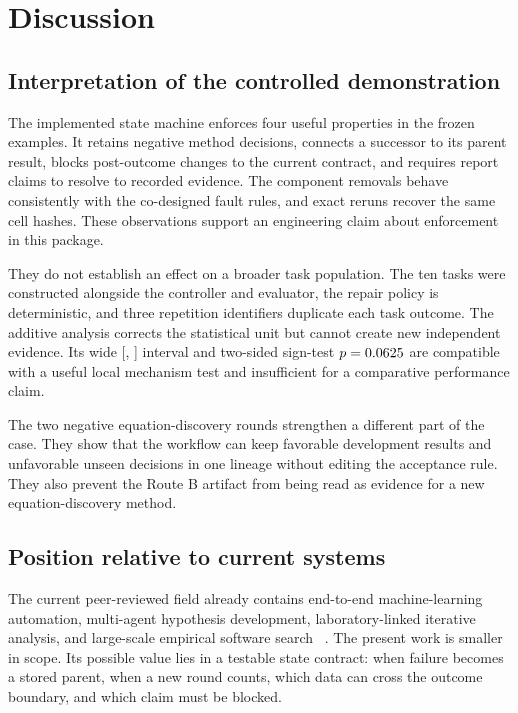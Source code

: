 \section{Discussion}
\label{sec:discussion}

\subsection{Interpretation of the controlled demonstration}

The implemented state machine enforces four useful properties in the frozen
examples. It retains negative method decisions, connects a successor to its
parent result, blocks post-outcome changes to the current contract, and
requires report claims to resolve to recorded evidence. The component
removals behave consistently with the co-designed fault rules, and exact
reruns recover the same cell hashes. These observations support an engineering
claim about enforcement in this package.

They do not establish an effect on a broader task population. The ten tasks
were constructed alongside the controller and evaluator, the repair policy is
deterministic, and three repetition identifiers duplicate each task outcome.
The additive analysis corrects the statistical unit but cannot create new
independent evidence. Its wide [\TaskLevelCILower{}, \TaskLevelCIUpper{}]
interval and two-sided sign-test \(p=0.0625{}\) are compatible with
a useful local mechanism test and insufficient for a comparative performance
claim.

The two negative equation-discovery rounds strengthen a different part of the
case. They show that the workflow can keep favorable development results and
unfavorable unseen decisions in one lineage without editing the acceptance
rule. They also prevent the Route B artifact from being read as evidence for
a new equation-discovery method.

\subsection{Position relative to current systems}

The current peer-reviewed field already contains end-to-end machine-learning
automation, multi-agent hypothesis development, laboratory-linked iterative
analysis, and large-scale empirical software search
~\cite{lu2026aiscientist,gottweis2026coscientist,ghareeb2026robin,
aygun2026era}. The present work is smaller in scope. Its possible value lies
in a testable state contract: when failure becomes a stored parent, when a new
round counts, which data can cross the outcome boundary, and which claim must
be blocked.

